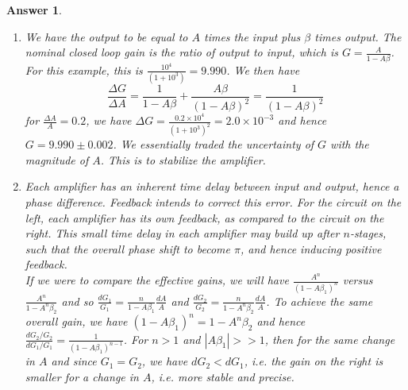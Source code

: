 \documentclass[a4paper]{article}
\newtheorem{ans}{Answer}[section]
\theoremstyle{new}
\begin{document}
\begin{ans}\leavevmode
\begin{enumerate}[label=(\alph*)]
\item We have the output to be equal to $A$ times the input plus $\beta$ times output. The nominal closed loop gain is the ratio of output to input, which is $G=\frac{A}{1-A\beta}$. For this example, this is $\frac{10^4}{(1+10^3)}=9.990$. We then have
$$\frac{\Delta G}{\Delta A}=\frac{1}{1-A\beta}+\frac{A\beta}{(1-A\beta)^2}=\frac{1}{(1-A\beta)^2}$$
for $\frac{\Delta A}{A}=0.2$, we have $\Delta G=\frac{0.2\times10^4}{(1+10^3)^2}=2.0\times10^{-3}$ and hence $G=9.990\pm0.002$. We essentially traded the uncertainty of $G$ with the magnitude of $A$. This is to stabilize the amplifier.
\item Each amplifier has an inherent time delay between input and output, hence a phase difference. Feedback intends to correct this error. For the circuit on the left, each amplifier has its own feedback, as compared to the circuit on the right. This small time delay in each amplifier may build up after $n$-stages, such that the overall phase shift to become $\pi$, and hence inducing positive feedback.\\[5pt]
If we were to compare the effective gains, we will have $\frac{A^n}{(1-A\beta_1)^n}$ versus $\frac{A^n}{1-A^n\beta_2}$ and so $\frac{dG_1}{G_1}=\frac{n}{1-A\beta_1}\frac{dA}{A}$ and $\frac{dG_2}{G_2}=\frac{n}{1-A^n\beta_2}\frac{dA}{A}$. To achieve the same overall gain, we have $(1-A\beta_1)^n=1-A^n\beta_2$ and hence $\frac{dG_2/G_2}{dG_1/G_1}=\frac{1}{(1-A\beta_1)^{n-1}}$. For $n>1$ and $|A\beta_1|>>1$, then for the same change in $A$ and since $G_1=G_2$, we have $dG_2<dG_1$, i.e. the gain on the right is smaller for a change in $A$, i.e. more stable and precise.
\end{enumerate}
\end{ans}
\newpage
\end{document}

